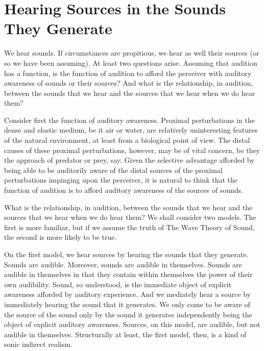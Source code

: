 \documentclass[12pt]{article}
\begin{document}

\section{Hearing Sources in the Sounds They Generate} %
\label{sec:hearing_sources_in_the_sounds_they_generate}

We hear sounds. If circumstances are propitious, we hear as well their sources (or so we have been assuming). At least two questions arise. Assuming that audition has a function, is the function of audition to afford the perceiver with auditory awareness of sounds or their sources? And what is the relationship, in audition, between the sounds that we hear and the sources that we hear when we do hear them?

Consider first the function of auditory awareness. Proximal perturbations in the dense and elastic medium, be it air or water, are relatively uninteresting features of the natural environment, at least from a biological point of view. The distal causes of these proximal perturbations, however, may be of vital concern, be they the approach of predator or prey, say. Given the selective advantage afforded by being able to be auditorily aware of the distal sources of the proximal perturbations impinging upon the perceiver, it is natural to think that the function of audition is to afford auditory awareness of the sources of sounds.

What is the relationship, in audition, between the sounds that we hear and the sources that we hear when we do hear them? We shall consider two models. The first is more familiar, but if we assume the truth of The Wave Theory of Sound, the second is more likely to be true. 

On the first model, we hear sources by hearing the sounds that they generate. Sounds are audible. Moreover, sounds are audible in themselves. Sounds are audible in themselves in that they contain within themselves the power of their own audibility. Sound, so understood, is the immediate object of explicit awareness afforded by auditory experience. And we mediately hear a source by immediately hearing the sound that it generates. We only come to be aware of the source of the sound only by the sound it generates independently being the object of explicit auditory awareness. Sources, on this model, are audible, but not audible in themselves. Structurally at least, the first model, then, is a kind of sonic indirect realism.
\end{document}

